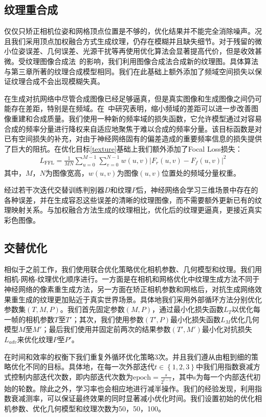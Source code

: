 \subsection{纹理重合成}
仅仅只矫正相机位姿和网格顶点位置是不够的，优化结果并不能完全消除噪声。况且我们采用顶点加权融合方式生成纹理，仍存在模糊并且缺失细节。对于残留的微小位姿误差、几何误差、光源干扰等再使用优化算法会显著提高代价，但是收效甚微。受纹理图像合成法~\cite{bi2017patch,JingweiHuang2020AdversarialTO}的影响，我们利用图像合成法合成新的纹理图。具体算法与第三章所著的纹理合成模型相同。我们在此基础上额外添加了频域空间损失以保证纹理合成不会出现模糊失真。\par

在生成对抗网络中尽管合成图像已经足够逼真，但是真实图像和生成图像之间仍可能存在差距，特别是在频域。在~\cite{jiang2021focal}中研究表明，缩小频域的差距可以进一步改善图像重建和合成质量。我们使用一种新的频率域的损失函数，它允许模型通过对容易合成的频率分量进行降权来自适应地聚焦于难以合成的频率分量。该目标函数是对已有空间损失的补充，对由于神经网络固有的偏差造成的重要频率信息的损失提供了巨大的阻抗。在优化目标\eqref{texture}基础上我们额外添加了Focal Loss损失：
\begin{align}
	L_\mathrm{FFL}=\frac{1}{M N} \sum_{u=0}^{M-1} \sum_{v=0}^{N-1} w(u, v)\left|F_{r}(u, v)-F_{f}(u, v)\right|^{2}
\end{align}
其中，$M，N$为图像宽高，$w(u, v)$为图像$(u,v)$位置处的频域分量权重。\par
经过若干次迭代交替训练判别器$D$和纹理$P$后，神经网络会学习三维场景中存在的各种误差，并在生成容忍这些误差的清晰的纹理图像，而不需要额外更新已有的纹理映射关系。与加权融合方法生成的纹理相比，优化后的纹理更逼真，更接近真实彩色图像。\par

\subsection{交替优化}
相似于之前工作，我们使用联合优化策略优化相机参数、几何模型和纹理。我们用相机-网格-纹理优化顺序进行。一方面是在相机和网格优化中纹理生成方法不同于神经网络的像素重生成方法，另一方面在矫正相机参数和网格后，对抗生成网络效果重生成的纹理更加贴近于真实世界场景。具体地我们采用外部循环方法分别优化参数集$(T,M,P)$。我们首先固定参数$(M,P)$，通过最小化损失函数$L_T$以优化每一帧的相机参数$T$至$T'$；其次，我们使用参数$(T',P)$最小化损失函数$L_M$优化几何模型$M$至$M'$；最后我们使用并固定前两次的结果参数$(T',M')$最小化对抗损失$L_{adv}$来优化纹理$P$至$P'$。\par
在时间和效率的权衡下我们重复外循环优化策略3次。并且我们遵从由粗到细的策略优化不同的目标。具体地，在每一次外部迭代$t\in \left \{ 1,2,3 \right \}$中我们用指数衰减方式控制内部迭代次数，即内部迭代次数为$\text{epoch}  =\frac{s}{2^{t-1}}$，其中s为每一个内部迭代初始的轮数。除此之外，学习率也会相应地进行减半操作。我们的经验发现，利用指数衰减测率，可以保证最终效果的同时显著减小优化时间。我们设置初始的优化相机参数、优化几何模型和纹理次数为50，50，100。

